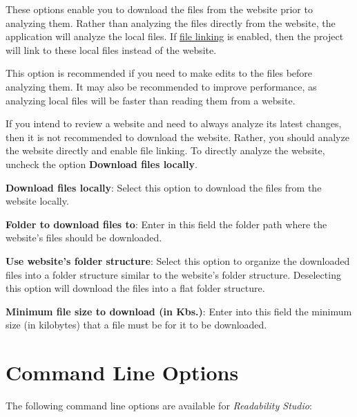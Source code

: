 \documentclass[
]{book}
\theoremstyle{definition}
\theoremstyle{definition}
\theoremstyle{definition}
\theoremstyle{definition}
\theoremstyle{remark}
\begin{document}
These options enable you to download the files from the website prior to analyzing them. Rather than analyzing the files directly from the website, the application will analyze the local files. If \protect\hyperlink{options-document}{file linking} is enabled, then the project will link to these local files instead of the website.

This option is recommended if you need to make edits to the files before analyzing them. It may also be recommended to improve performance, as analyzing local files will be faster than reading them from a website.

If you intend to review a website and need to always analyze its latest changes, then it is not recommended to download the website. Rather, you should analyze the website directly and enable file linking. To directly analyze the website, uncheck the option \textbf{Download files locally}.

\textbf{Download files locally}: Select this option to download the files from the website locally.

\textbf{Folder to download files to}: Enter in this field the folder path where the website's files should be downloaded.

\textbf{Use website's folder structure}: Select this option to organize the downloaded files into a folder structure similar to the website's folder structure. Deselecting this option will download the files into a flat folder structure.

\textbf{Minimum file size to download (in Kbs.)}: Enter into this field the minimum size (in kilobytes) that a file must be for it to be downloaded.

\hypertarget{command-line-options}{%
\section{Command Line Options}\label{command-line-options}}

The following command line options are available for \emph{Readability Studio}:
\end{document}
